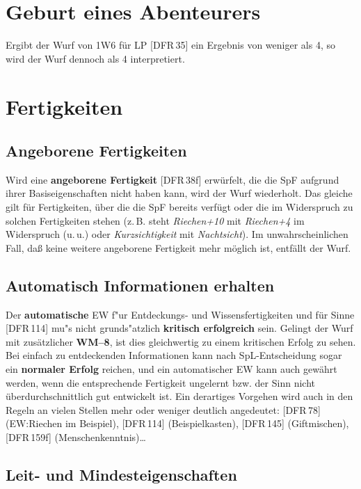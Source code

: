 \documentclass[10pt,a4paper,germanpar]{article}
\begin{document}
\section{Geburt eines Abenteurers}

Ergibt der Wurf von 1W6 für LP [DFR\,35] ein Ergebnis von weniger als
4, so wird der Wurf dennoch als 4 interpretiert.

\section{Fertigkeiten}

\subsection{Angeborene Fertigkeiten}

Wird eine \textbf{angeborene Fertigkeit} [DFR\,38f] erwürfelt, die die
SpF aufgrund ihrer Basiseigenschaften nicht haben kann, wird der Wurf
wiederholt. Das gleiche gilt für Fertigkeiten, über die die SpF
bereits verfügt oder die im Widerspruch zu solchen Fertigkeiten stehen
(z.\,B. steht \emph{Riechen+10} mit \emph{Riechen+4} im Widerspruch
(u.\,u.) oder \emph{Kurzsichtigkeit} mit \emph{Nachtsicht}). Im
unwahrscheinlichen Fall, daß keine weitere angeborene Fertigkeit mehr
möglich ist, entfällt der Wurf.

\subsection{Automatisch Informationen erhalten}

Der \textbf{automatische} EW f"ur Entdeckungs- und Wissensfertigkeiten
und für Sinne [DFR\,114] mu"s nicht grunds"atzlich \textbf{kritisch
  erfolgreich} sein. Gelingt der Wurf mit zusätzlicher \textbf{WM--8},
ist dies gleichwertig zu einem kritischen Erfolg zu sehen.
Bei einfach zu entdeckenden Informationen kann nach
SpL-Ent\-schei\-dung sogar ein \textbf{normaler Erfolg} reichen, und
ein automatischer EW kann auch gewährt werden, wenn die entsprechende
Fertigkeit ungelernt bzw. der Sinn nicht überdurchschnittlich gut
entwickelt ist. Ein derartiges Vorgehen wird auch in den Regeln an
vielen Stellen mehr oder weniger deutlich angedeutet: [DFR\,78]
(EW:Riechen im Beispiel), [DFR\,114] (Beispielkasten), [DFR\,145]
(Giftmischen), [DFR\,159f] (Menschenkenntnis)\dots

\subsection{Leit- und Mindesteigenschaften}
\end{document}
